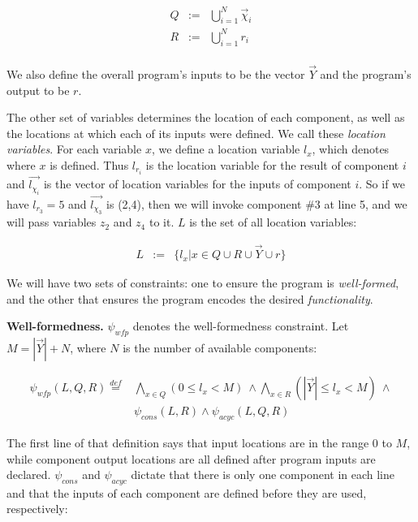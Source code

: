 \documentclass[11pt]{article}
\begin{document}
\[
\begin{array}{ccl}
Q & := & \bigcup_{i=1}^N \overrightarrow{\chi}_i \\[0.5em]
R & := & \bigcup_{i=1}^N {r_i}  \\[0.5em]
\end{array}
\]

We also define the overall program's inputs to be the vector $\overrightarrow{Y}$ and the program's output to be $r$.

The other set of variables determines the location of each component, as well
as the locations at which each of its inputs were defined.  We call these \textit{location variables}.  For each variable $x$, we define a location variable $l_x$, which denotes where $x$ is defined.  Thus $l_{r_i}$ is the location variable for the result of component $i$ and $\overrightarrow{l_{\chi_i}}$ is the vector of location variables for the inputs of component $i$.
So if we have $l_{r_3}=5$ and $\overrightarrow{l_{\chi_3}}$ is (2,4), then we will invoke component \#3 at line 5, and we will pass variables $z_2$ and $z_4$ to it.
$L$ is the set of all location variables:

\[
\begin{array}{ccl}
L & := & \{l_x | x \in Q \cup R \cup \overrightarrow{Y} \cup {r}\} 
\end{array}
\]

We will have two sets of constraints: one to ensure the program is \emph{well-formed}, and the other that ensures the program encodes the desired \emph{functionality}.

\vspace{0.75em}
\noindent\textbf{Well-formedness.}  $\psi_{wfp}$ denotes the well-formedness constraint.  Let $M = |\overrightarrow{Y}| + N$, where $N$ is the number of available components:

\[
\begin{array}{ll}
\psi_{wfp}(L,Q,R)  \stackrel{def}{=} & \bigwedge\limits_{x \in Q} ( 0 \leq l_x < M)~ \wedge 
 \bigwedge\limits_{x\in R} (|\overrightarrow{Y}| \leq l_x < M) ~\wedge \\
& \psi_{cons}(L,R) \wedge  \psi_{acyc}(L,Q,R)
\end{array}
\]

The first line of that definition says that input locations are in the range 0 to $M$, while component output locations are all defined after program inputs are declared.  $\psi_{cons}$ and $\psi_{acyc}$ dictate that there is only one component in each line and that the inputs of each component are defined before they are used, respectively:
\end{document}
